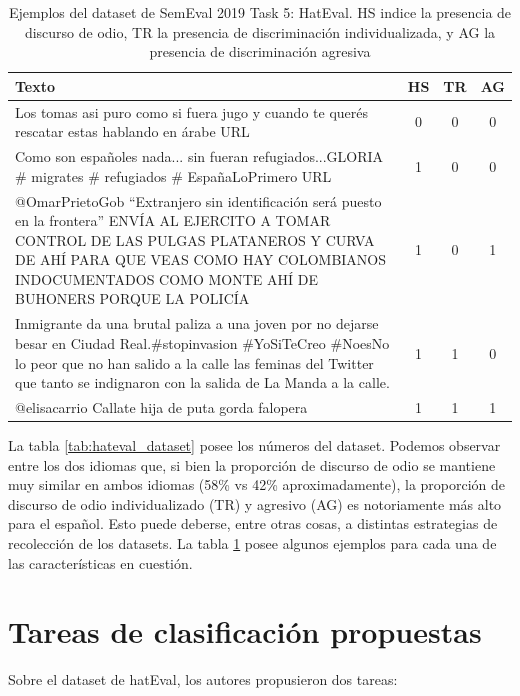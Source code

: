 \begin{table}
    \centering
    \footnotesize
    \begin{tabularx}{\textwidth}{X c c c}
        Texto & HS & TR & AG \\
        \hline
        Los tomas asi puro como si fuera jugo y cuando te querés rescatar estas hablando en árabe URL & 0 & 0 & 0 \\
        Como son españoles nada... sin fueran refugiados...GLORIA \# migrates \# refugiados \# EspañaLoPrimero URL & 1 & 0 & 0 \\
        @OmarPrietoGob ``Extranjero sin identificación será puesto en la frontera'' ENVÍA AL EJERCITO A TOMAR CONTROL DE LAS PULGAS PLATANEROS Y CURVA DE AHÍ PARA QUE VEAS COMO HAY COLOMBIANOS INDOCUMENTADOS COMO MONTE AHÍ DE BUHONERS PORQUE LA POLICÍA & 1 & 0 & 1 \\
        Inmigrante da una brutal paliza a una joven por no dejarse besar en Ciudad Real.\#stopinvasion \#YoSiTeCreo \#NoesNo lo peor que no han salido a la calle las feminas del Twitter que tanto se indignaron con la salida de La Manda a la calle. & 1 & 1 & 0 \\
        @elisacarrio Callate hija de puta gorda falopera & 1 & 1 & 1 \\
        \hline
    \end{tabularx}
    \caption{Ejemplos del dataset de SemEval 2019 Task 5: HatEval. HS indice la presencia de discurso de odio, TR la presencia de discriminación individualizada, y AG la presencia de discriminación agresiva}
    \label{tab:hateval_dataset_examples}
\end{table}


La tabla \ref{tab:hateval_dataset} posee los números del dataset. Podemos observar entre los dos idiomas que, si bien la proporción de discurso de odio se mantiene muy similar en ambos idiomas (58\% vs 42\% aproximadamente), la proporción de discurso de odio individualizado (TR) y agresivo (AG) es notoriamente más alto para el español. Esto puede deberse, entre otras cosas, a distintas estrategias de recolección de los datasets. La tabla \ref{tab:hateval_dataset_examples} posee algunos ejemplos para cada una de las características en cuestión.

\section{Tareas de clasificación propuestas}

Sobre el dataset de hatEval, los autores propusieron dos tareas:

